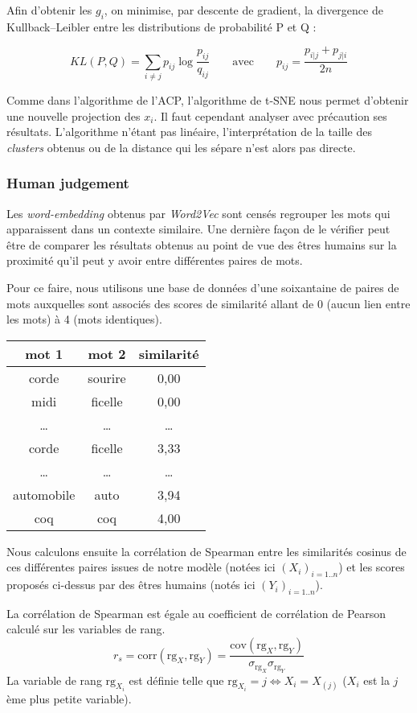 \documentclass[11pt,french,french]{article}
\begin{document}
Afin d'obtenir les \(g_i\), on minimise, par descente de gradient, la
divergence de Kullback--Leibler entre les distributions de probabilité P
et Q :

\[KL(P,Q) = \sum_{i \neq j} { p_{ij} \log{\frac{p_{ij}}{q_{ij}}}} \qquad\text{avec}\qquad p_{ij} = \frac{p_{i|j} + p_{j|i}}{2n}\]

Comme dans l'algorithme de l'ACP, l'algorithme de t-SNE nous permet
d'obtenir une nouvelle projection des \(x_i\). Il faut cependant
analyser avec précaution ses résultats. L'algorithme n'étant pas
linéaire, l'interprétation de la taille des \emph{clusters} obtenus ou
de la distance qui les sépare n'est alors pas directe.

\hypertarget{human-judgement}{%
\subsubsection{Human judgement}\label{human-judgement}}

Les \emph{word-embedding} obtenus par \emph{Word2Vec} sont censés
regrouper les mots qui apparaissent dans un contexte similaire. Une
dernière façon de le vérifier peut être de comparer les résultats
obtenus au point de vue des êtres humains sur la proximité qu'il peut y
avoir entre différentes paires de mots.

Pour ce faire, nous utilisons une base de données d'une soixantaine de
paires de mots auxquelles sont associés des scores de similarité allant
de 0 (aucun lien entre les mots) à 4 (mots identiques).

\begin{tabular}{|c|c|c|}
    \hline
    mot 1 & mot 2 & similarité  \tabularnewline
    \hline
    corde & sourire & 0,00   \tabularnewline
    midi & ficelle & 0,00   \tabularnewline
    \dots & \dots & \dots   \tabularnewline
    corde & ficelle & 3,33   \tabularnewline
    \dots & \dots & \dots   \tabularnewline
    automobile & auto & 3,94   \tabularnewline
    coq & coq & 4,00   \tabularnewline
    \hline
 \end{tabular}

Nous calculons ensuite la corrélation de Spearman entre les similarités
cosinus de ces différentes paires issues de notre modèle (notées ici
\((X_i)_{i=1..n}\)) et les scores proposés ci-dessus par des êtres
humains (notés ici \((Y_i)_{i=1..n}\)).

La corrélation de Spearman est égale au coefficient de corrélation de
Pearson calculé sur les variables de rang. \[
r_s = \mathrm{corr}(\mathrm{rg}_X, \mathrm{rg}_Y) = 
\frac{\mathrm{cov}(\mathrm{rg}_X, \mathrm{rg}_Y)}{
\sigma_{\mathrm{rg}_X} \sigma_{\mathrm{rg}_Y}
}
\] La variable de rang \(\mathrm{rg}_{X_i}\) est définie telle que
\(\mathrm{rg}_{X_i}=j \iff X_i = X_{(j)}\) (\(X_i\) est la \(j\)ème plus
petite variable).
\end{document}
